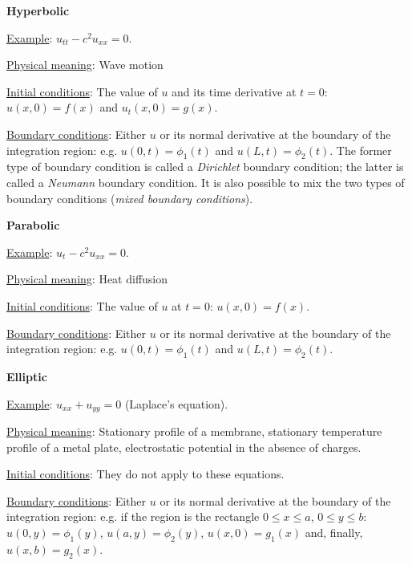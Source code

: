 \centerline{\bf Hyperbolic}

\noindent \underline{Example}: $u_{t t} - c^2 u_{xx} = 0$.

\noindent \underline{Physical meaning}: Wave motion

\noindent \underline{Initial conditions}: The value of $u$ and its
time derivative at $t=0$: $u(x,0)=f(x)$ and $u_t(x,0)=g(x)$.

\noindent \underline{Boundary conditions}: Either $u$ or its normal
derivative at the boundary of the integration region: e.g. $u(0,t) =
\phi_1(t)$ and $u(L,t)= \phi_2(t)$.  The former type of boundary
condition is called a \textit{Dirichlet} boundary condition; the
latter is called a \textit{Neumann} boundary condition.  It is also
possible to mix the two types of boundary conditions (\textit{mixed
  boundary conditions}).

\bigskip

\centerline{\bf Parabolic}

\noindent \underline{Example}: $u_{t} - c^2 u_{xx} = 0$.

\noindent \underline{Physical meaning}: Heat diffusion

\noindent \underline{Initial conditions}: The value of $u$ at $t=0$:
$u(x,0)=f(x)$.

\noindent \underline{Boundary conditions}: Either $u$ or its normal
derivative at the boundary of the integration region: e.g. $u(0,t) =
\phi_1(t)$ and $u(L,t)= \phi_2(t)$.

\bigskip

\centerline{\bf Elliptic}

\noindent \underline{Example}: $u_{xx} + u_{y y} = 0$ (Laplace's
equation).

\noindent \underline{Physical meaning}: Stationary profile of a
membrane, stationary temperature profile of a metal plate,
electrostatic potential in the absence of charges.

\noindent \underline{Initial conditions}: They do not apply to these
equations.

\noindent \underline{Boundary conditions}: Either $u$ or its normal
derivative at the boundary of the integration region: e.g. if the
region is the rectangle $0 \le x \le a$, $0 \le y \le b$: $u(0,y) =
\phi_1(y)$, $u(a,y)= \phi_2(y)$, $u(x,0) = g_1(x)$ and, finally,
$u(x,b)=g_2(x)$.

